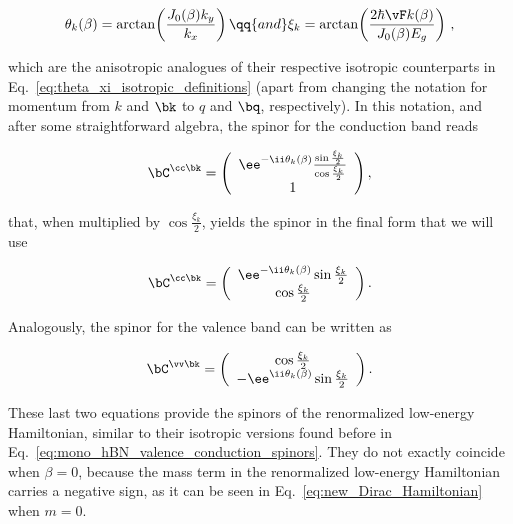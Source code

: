 \begin{equation}
    \label{eq:theta_xi_anisotropic_definitions}
    \theta_{k}(\beta)=\arctan\!\left(\frac{J_{0}(\beta)k_{y}}{k_{x}}\right) \qq{and} \xi_{k}=\arctan\!\left(\frac{2\hbar \vF k(\beta)}{J_{0}(\beta)E_{g}}\right)\,,
\end{equation}

\noindent which are the anisotropic analogues of their respective isotropic counterparts in Eq.~\eqref{eq:theta_xi_isotropic_definitions} (apart from changing the notation for momentum from $k$ and $\bk$ to $q$ and $\bq$, respectively).
In this notation, and after some straightforward algebra, the spinor for the conduction band reads

\begin{equation}
     \bC^{\cc \bk} = \left(
    \begin{array}{c}
        \ee^{-\ii\theta_{k}(\beta)}\frac{\sin\frac{\xi_{k}}{2}}{\cos\frac{\xi_{k}}{2}} \\ 1
    \end{array}\right),
\end{equation}

\noindent that, when multiplied by $\cos\frac{\xi_{k}}{2}$, yields the spinor in the final form that we will use

\begin{equation}
\label{eq:conduction_spinor}
     \bC^{\cc \bk}=\left(
    \begin{array}{c}
        \ee^{-\ii\theta_{k}(\beta)}\sin\frac{\xi_{k}}{2} \\ 
        \cos\frac{\xi_{k}}{2}
    \end{array}\right).
\end{equation}

\noindent Analogously, the spinor for the valence band can be written as

\begin{equation}
    \label{eq:valence_spinor}
    \bC^{\vv \bk}=\left(
    \begin{array}{c}
        \cos\frac{\xi_{k}}{2} \\ 
        -\ee^{\ii\theta_{k}(\beta)}\sin\frac{\xi_{k}}{2}
    \end{array}\right).
\end{equation}

\noindent These last two equations provide the spinors of the renormalized low-energy Hamiltonian, similar to their isotropic versions found before in Eq.~\eqref{eq:mono_hBN_valence_conduction_spinors}.
They do not exactly coincide when $\beta = 0$, because the mass term in the renormalized low-energy Hamiltonian carries a negative sign, as it can be seen in Eq.~\eqref{eq:new_Dirac_Hamiltonian} when $m=0$.

